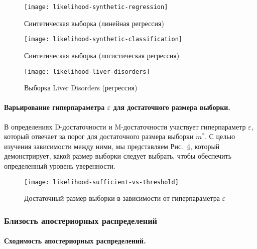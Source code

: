 \begin{figure}[h!]
    \centering
    \texttt{[image: likelihood-synthetic-regression]}
    \caption{Синтетическая выборка (линейная регрессия)}
    \label{likelihood-synthetic-regression}
\end{figure}

\begin{figure}[h!]
    \centering
    \texttt{[image: likelihood-synthetic-classification]}
    \caption{Синтетическая выборка (логистическая регрессия)}
    \label{likelihood-synthetic-classification}
\end{figure}

\begin{figure}[h!]
    \centering
    \texttt{[image: likelihood-liver-disorders]}
    \caption{Выборка Liver Disorders (регрессия)}
    \label{likelihood-liver-disorders}
\end{figure}

\paragraph{Варьирование гиперпараметра $\varepsilon$ для достаточного размера выборки.}

В определениях D-достаточности и M-достаточности участвует гиперпараметр $\varepsilon$, который отвечает за порог для достаточного размера выборки $m^*$. С целью изучения зависимости между ними, мы представляем Рис.~\ref{likelihood-sufficient-vs-threshold}, который демонстрирует, какой размер выборки следует выбрать, чтобы обеспечить определенный уровень уверенности.

\begin{figure}[h!]
    \centering
    \texttt{[image: likelihood-sufficient-vs-threshold]}
    \caption{Достаточный размер выборки в зависимости от гиперпараметра $\varepsilon$}
    \label{likelihood-sufficient-vs-threshold}
\end{figure}

\subsubsection{Близость апостериорных распределений}

\paragraph{Сходимость апостериорных распределений.}

